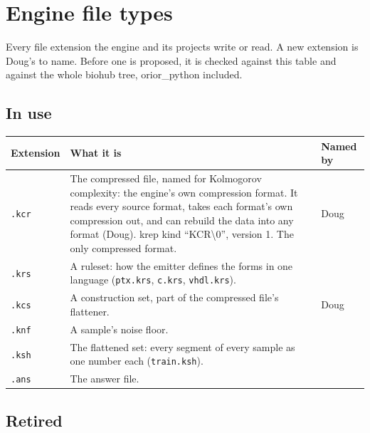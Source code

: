 \chapter{\texorpdfstring{Engine file types}{Engine file types}}
\label{chap:file-types-table}

Every file extension the engine and its projects write or read. A new extension is Doug's to name. Before one is proposed, it is checked against this table and against the whole biohub tree, orior\_\allowbreak{}python included.

\section{\texorpdfstring{In use}{In use}}

{\small
\setlength{\tabcolsep}{6pt}
\begin{longtable}{>{\RaggedRight\arraybackslash}p{}>{\RaggedRight\arraybackslash}p{}>{\RaggedRight\arraybackslash}p{}}
\toprule
Extension & What it is & Named by \\
\midrule
\endhead
\texttt{.\allowbreak{}kcr} & The compressed file, named for Kolmogorov complexity: the engine's own compression format. It reads every source format, takes each format's own compression out, and can rebuild the data into any format (Doug). krep kind “KCR\textbackslash{}0”, version 1. The only compressed format. & Doug \\
\texttt{.\allowbreak{}krs} & A ruleset: how the emitter defines the forms in one language (\texttt{ptx.\allowbreak{}krs}, \texttt{c.\allowbreak{}krs}, \texttt{vhdl.\allowbreak{}krs}). &  \\
\texttt{.\allowbreak{}kcs} & A construction set, part of the compressed file's flattener. & Doug \\
\texttt{.\allowbreak{}knf} & A sample's noise floor. &  \\
\texttt{.\allowbreak{}ksh} & The flattened set: every segment of every sample as one number each (\texttt{train.\allowbreak{}ksh}). &  \\
\texttt{.\allowbreak{}ans} & The answer file. &  \\
\bottomrule
\end{longtable}
}

\section{\texorpdfstring{Retired}{Retired}}

